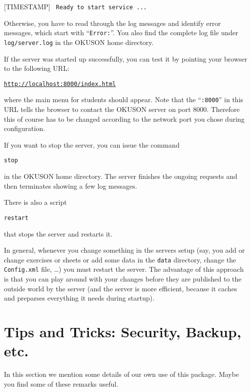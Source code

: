 \documentclass[12pt,openany,a4paper]{book}
\newcommand{\OKUSON}{\textsf{OKUSON}}
\begin{document}
\hspace*{1cm}[TIMESTAMP] \ \texttt{Ready to start service ...}

Otherwise, you have to read through the log messages and identify error 
messages, which start with ``\texttt{Error:}''. You also find the complete
log file under \texttt{log/server.log} in the {\OKUSON} home directory.

If the server was started up successfully, you can test it by
pointing your browser to the following URL:

\hspace*{1cm}\href{http://localhost:8000/index.html}%
{\texttt{http://localhost:8000/index.html}}

where the main menu for students should appear. Note that the
``\texttt{:8000}'' in this URL tells the browser to contact the
{\OKUSON} server on port $8000$. Therefore this of course has to be
changed according to the network port you chose during configuration.

If you want to stop the server, you can issue the command

\hspace*{1cm}\texttt{stop}

in the {\OKUSON} home directory.
The server finishes the ongoing requests and then terminates showing a few 
log messages.

There is also a script 

\hspace*{1cm}\texttt{restart}

that stops the server and restarts it. 

In general, whenever you change something in the servers setup (say, you 
add or change exercises or sheets or add some data in the \texttt{data} 
directory, change the \texttt{Config.xml} file, \ldots) you must restart 
the server. The advantage of this approach is that 
you can play around with your changes before they are published to the outside 
world by the server (and the server is more efficient, because it caches and
preparses everything it needs during startup).

\section{Tips and Tricks: Security, Backup, etc.}\label{sec:insttips}

In this section we mention some details of our own use of this package.
Maybe you find some of these remarks useful.
\end{document}
